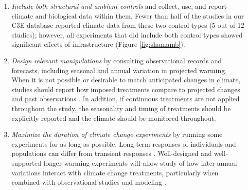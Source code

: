 \documentclass{article}
\begin{document}
\begin{enumerate}
\item\textit{Include both structural and ambient controls} and collect, use, and report climate and biological data within them. Fewer than half of the studies in our C3E database reported climate data from these two control types (5 out of 12 studies); however, all experiments that did include both control types showed significant effects of infrastructure (Figure \ref{fig:shamamb}). %
\item\textit{Design relevant manipulations} by consulting observational records and forecasts, including seasonal and annual variation in projected warming. When it is not possible or desirable to match anticipated changes in climate, studies should report how imposed treatments compare to projected changes and past observations \citep[e.g.,][]{hoover2014}. In addition, if continuous treatments are not applied throughout the study, the seasonality and timing of treatments should be explicitly reported and the climate should be monitored throughout.

\item\textit{Maximize the duration of climate change experiments} by running some experiments for as long as possible. Long-term responses of individuals and populations can differ from transient responses \citep{saleska2002,franklin1989,giasson2013,harte2015}. Well-designed and well-supported longer warming experiments will allow study of how inter-annual variations interact with climate change treatments, particularly when combined with observational studies and modeling \citep{luo2011}.

\end{enumerate}

\clearpage
\end{document}
